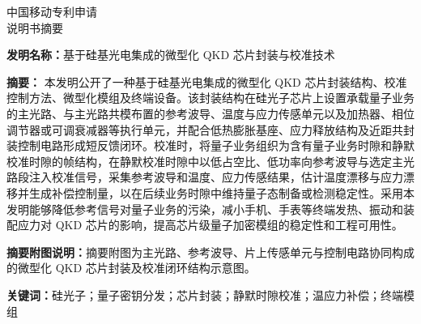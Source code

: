 \documentclass[12pt,a4paper]{article}
\begin{document}
\begin{center}
    {\Large\heiti 中国移动专利申请} \\[0.5em]
    {\Huge\heiti 说明书摘要} \\[0.8em]
\end{center}

\noindent\textbf{发明名称：}基于硅基光电集成的微型化 QKD 芯片封装与校准技术

\vspace{0.8em}

\noindent\textbf{摘要：}
本发明公开了一种基于硅基光电集成的微型化 QKD 芯片封装结构、校准控制方法、微型化模组及终端设备。该封装结构在硅光子芯片上设置承载量子业务的主光路、与主光路共模布置的参考波导、温度与应力传感单元以及加热器、相位调节器或可调衰减器等执行单元，并配合低热膨胀基座、应力释放结构及近距共封装控制电路形成短反馈闭环。校准时，将量子业务组织为含有量子业务时隙和静默校准时隙的帧结构，在静默校准时隙中以低占空比、低功率向参考波导与选定主光路段注入校准信号，采集参考波导和温度、应力传感结果，估计温度漂移与应力漂移并生成补偿控制量，以在后续业务时隙中维持量子态制备或检测稳定性。采用本发明能够降低参考信号对量子业务的污染，减小手机、手表等终端发热、振动和装配应力对 QKD 芯片的影响，提高芯片级量子加密模组的稳定性和工程可用性。

\vspace{0.6em}

\noindent\textbf{摘要附图说明：}摘要附图为主光路、参考波导、片上传感单元与控制电路协同构成的微型化 QKD 芯片封装及校准闭环结构示意图。

\vspace{0.6em}

\noindent\textbf{关键词：}硅光子；量子密钥分发；芯片封装；静默时隙校准；温应力补偿；终端模组
\end{document}
